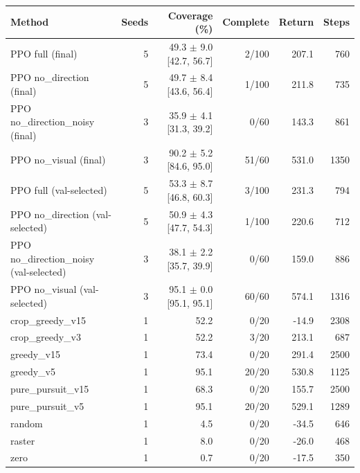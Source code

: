 \begin{tabular}{lrrrrr}
\toprule
Method & Seeds & Coverage (\%) & Complete & Return & Steps \\
\midrule
PPO full (final) & 5 & 49.3 $\pm$ 9.0 [42.7, 56.7] & 2/100 & 207.1 & 760 \\
PPO no_direction (final) & 5 & 49.7 $\pm$ 8.4 [43.6, 56.4] & 1/100 & 211.8 & 735 \\
PPO no_direction_noisy (final) & 3 & 35.9 $\pm$ 4.1 [31.3, 39.2] & 0/60 & 143.3 & 861 \\
PPO no_visual (final) & 3 & 90.2 $\pm$ 5.2 [84.6, 95.0] & 51/60 & 531.0 & 1350 \\
PPO full (val-selected) & 5 & 53.3 $\pm$ 8.7 [46.8, 60.3] & 3/100 & 231.3 & 794 \\
PPO no_direction (val-selected) & 5 & 50.9 $\pm$ 4.3 [47.7, 54.3] & 1/100 & 220.6 & 712 \\
PPO no_direction_noisy (val-selected) & 3 & 38.1 $\pm$ 2.2 [35.7, 39.9] & 0/60 & 159.0 & 886 \\
PPO no_visual (val-selected) & 3 & 95.1 $\pm$ 0.0 [95.1, 95.1] & 60/60 & 574.1 & 1316 \\
crop\_greedy\_v15 & 1 & 52.2 & 0/20 & -14.9 & 2308 \\
crop\_greedy\_v3 & 1 & 52.2 & 3/20 & 213.1 & 687 \\
greedy\_v15 & 1 & 73.4 & 0/20 & 291.4 & 2500 \\
greedy\_v5 & 1 & 95.1 & 20/20 & 530.8 & 1125 \\
pure\_pursuit\_v15 & 1 & 68.3 & 0/20 & 155.7 & 2500 \\
pure\_pursuit\_v5 & 1 & 95.1 & 20/20 & 529.1 & 1289 \\
random & 1 & 4.5 & 0/20 & -34.5 & 646 \\
raster & 1 & 8.0 & 0/20 & -26.0 & 468 \\
zero & 1 & 0.7 & 0/20 & -17.5 & 350 \\
\bottomrule
\end{tabular}